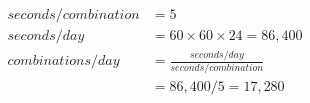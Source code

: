 \documentclass[preview, border=2mm]{standalone}
\begin{document}
\vspace*{\fill}

{\fontsize{32pt}{40pt}\selectfont
    \begin{align*}
        seconds/combination &= 5 \\
        seconds/day &= 60 \times 60 \times 24 = 86{,}400 \\
        combinations/day &= \frac{seconds/day}{seconds/combination} \\
        &= 86{,}400/5 = 17{,}280
    \end{align*}
}

\vspace*{\fill}
\end{document}
